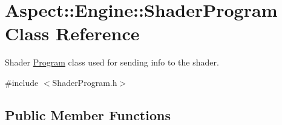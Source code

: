\hypertarget{class_aspect_1_1_engine_1_1_shader_program}{}\section{Aspect\+:\+:Engine\+:\+:Shader\+Program Class Reference}
\label{class_aspect_1_1_engine_1_1_shader_program}


Shader \mbox{\hyperlink{class_aspect_1_1_engine_1_1_program}{Program}} class used for sending info to the shader.  




{\ttfamily \#include $<$Shader\+Program.\+h$>$}

\subsection*{Public Member Functions}
